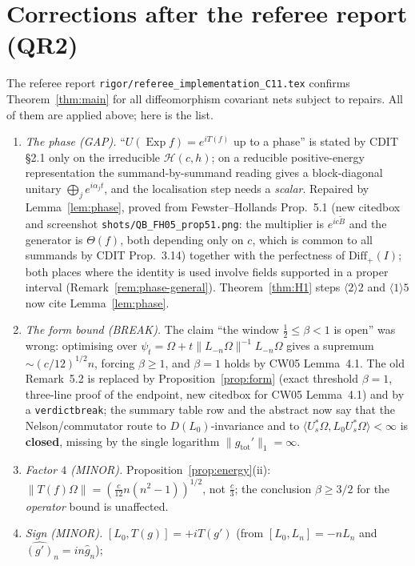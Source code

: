 \documentclass[11pt]{article}
\newcommand{\Om}{\Omega}
\newcommand{\Hil}{\mathcal H}
\newcommand{\Diff}{\mathrm{Diff}_+}
\newcommand{\ip}[2]{\langle #1,#2\rangle}
\newcommand{\norm}[1]{\lVert #1\rVert}
\newcommand{\gtot}{g_{\mathrm{tot}}}
\newcommand{\Exp}{\operatorname{Exp}}
\begin{document}
\section{Corrections after the referee report (QR2)}\label{sec:corrections}

The referee report \texttt{rigor/referee\_implementation\_C11.tex} confirms Theorem~\ref{thm:main} for all
diffeomorphism covariant nets subject to repairs.  All of them are applied above; here is the list.

\begin{enumerate}[leftmargin=1.8em,label=\textup{(R\arabic*)}]
\item \emph{The phase (GAP).}  ``$U(\Exp f)=e^{iT(f)}$ up to a phase'' is stated by CDIT \S2.1 only on the
irreducible $\Hil(c,h)$; on a reducible positive-energy representation the summand-by-summand reading gives a
block-diagonal unitary $\bigoplus_je^{i\alpha_jt}$, and the localisation step needs a \emph{scalar}.  Repaired by
Lemma~\ref{lem:phase}, proved from Fewster--Hollands Prop.~5.1 (new citedbox and screenshot
\texttt{shots/QB\_FH05\_prop51.png}: the multiplier is $e^{ic\widetilde B}$ and the generator is $\Theta(f)$, both
depending only on $c$, which is common to all summands by CDIT Prop.~3.14) together with the perfectness of
$\Diff(I)$; both places where the identity is used involve fields supported in a proper interval
(Remark~\ref{rem:phase-general}).  Theorem~\ref{thm:H1} steps $\langle2\rangle2$ and $\langle1\rangle5$ now cite
Lemma~\ref{lem:phase}.
\item \emph{The form bound (BREAK).}  The claim ``the window $\tfrac12\le\beta<1$ is open'' was wrong: optimising
over $\psi_t=\Om+t\norm{L_{-n}\Om}^{-1}L_{-n}\Om$ gives a supremum $\sim(c/12)^{1/2}n$, forcing $\beta\ge1$, and
$\beta=1$ holds by CW05 Lemma~4.1.  The old Remark~5.2 is replaced by Proposition~\ref{prop:form} (exact threshold
$\beta=1$, three-line proof of the endpoint, new citedbox for CW05 Lemma~4.1) and by a \texttt{verdictbreak}; the
summary table row and the abstract now say that the Nelson/commutator route to $D(L_0)$-invariance and to
$\ip{U_s^*\Om}{L_0U_s^*\Om}<\infty$ is \textbf{closed}, missing by the single logarithm
$\norm{\gtot'}_1=\infty$.
\item \emph{Factor $4$ (MINOR).}  Proposition~\ref{prop:energy}(ii): $\norm{T(f)\Om}=(\frac c{12}n(n^2-1))^{1/2}$,
not $\frac c3$; the conclusion $\beta\ge3/2$ for the \emph{operator} bound is unaffected.
\item \emph{Sign (MINOR).}  $[L_0,T(g)]=+iT(g')$ (from $[L_0,L_n]=-nL_n$ and $\widehat{(g')}_n=in\hat g_n$);

\end{enumerate}
\end{document}
